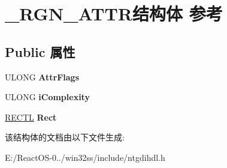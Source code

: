 \hypertarget{struct___r_g_n___a_t_t_r}{}\section{\+\_\+\+R\+G\+N\+\_\+\+A\+T\+T\+R结构体 参考}
\label{struct___r_g_n___a_t_t_r}
\subsection*{Public 属性}
\begin{DoxyCompactItemize}
\item 
\mbox{\label{struct___r_g_n___a_t_t_r_acf21d17d2fa7b452bf8538ce93a7de6c}} 
U\+L\+O\+NG {\bfseries Attr\+Flags}
\item 
\mbox{\label{struct___r_g_n___a_t_t_r_a0244cf739b64a2c036738b8ff411fe59}} 
U\+L\+O\+NG {\bfseries i\+Complexity}
\item 
\mbox{\label{struct___r_g_n___a_t_t_r_a46a8b47691bbe2d4e20451ad26b94dc0}} 
\hyperlink{struct___r_e_c_t_l}{R\+E\+C\+TL} {\bfseries Rect}
\end{DoxyCompactItemize}


该结构体的文档由以下文件生成\+:\begin{DoxyCompactItemize}
\item 
E\+:/\+React\+O\+S-\/0../win32ss/include/ntgdihdl.\+h\end{DoxyCompactItemize}
